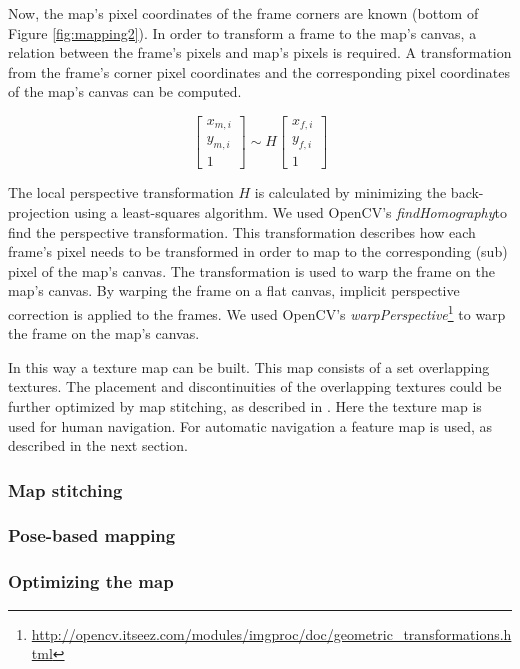 Now, the map's pixel coordinates of the frame corners are known (bottom of Figure \ref{fig:mapping2}).
In order to transform a frame to the map's canvas, a relation between the frame's pixels and map's pixels is required.
A transformation from the frame's corner pixel coordinates and the corresponding pixel coordinates of the map's canvas can be computed.

\begin{equation}
\left[ {
\begin{array}{c} x_{m,i} \\ y_{m,i} \\ 1 \end{array}
} \right]
\sim
H
\left[ {
\begin{array}{c} x_{f,i} \\ y_{f,i} \\ 1 \end{array}
} \right]
\end{equation}

The local perspective transformation $H$ is calculated by minimizing the back-projection using a least-squares algorithm.
We used OpenCV's \textit{findHomography}\footnotemark[3] to find the perspective transformation.
This transformation describes how each frame's pixel needs to be transformed in order to map to the corresponding (sub) pixel of the map's canvas.
The transformation is used to warp the frame on the map's canvas.
By warping the frame on a flat canvas, implicit perspective correction is applied to the frames.
We used OpenCV's \textit{warpPerspective}\footnote{\url{http://opencv.itseez.com/modules/imgproc/doc/geometric_transformations.html}} to warp the frame on the map's canvas.

In this way a texture map can be built. This map consists of a set overlapping textures. The placement and discontinuities of the overlapping textures could be further optimized by map stitching, as described in \cite{Visser2011imav}. Here the texture map is used for human navigation. For automatic navigation a feature map is used, as described in the next section.


			\subsubsection{Map stitching}
			\subsubsection{Pose-based mapping}
			\subsubsection{Optimizing the map}
